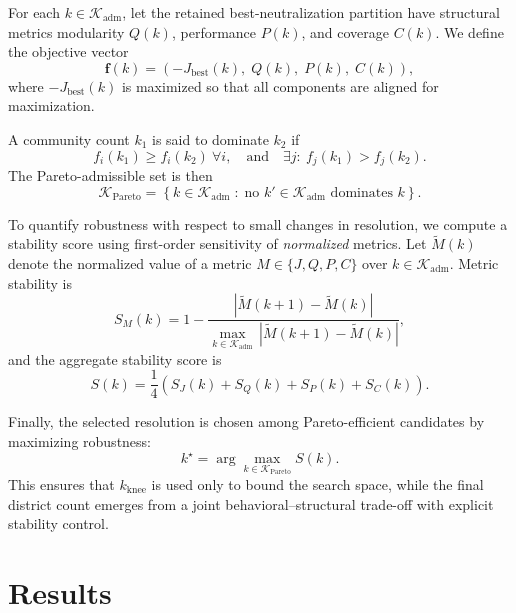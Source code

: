 \documentclass[conference]{IEEEtran}
\begin{document}
For each $k \in \mathcal{K}_{\mathrm{adm}}$, let the retained best-neutralization
partition have structural metrics modularity $Q(k)$, performance $P(k)$, and
coverage $C(k)$. We define the objective vector
\begin{equation}
\mathbf{f}(k)=\left(-J_{\mathrm{best}}(k),\;Q(k),\;P(k),\;C(k)\right),
\end{equation}
where $-J_{\mathrm{best}}(k)$ is maximized so that all components are aligned
for maximization.

A community count $k_1$ is said to dominate $k_2$ if
\begin{equation}
f_i(k_1)\ge f_i(k_2)\ \forall i,
\quad\text{and}\quad
\exists j:\ f_j(k_1)>f_j(k_2).
\end{equation}
The Pareto-admissible set is then
\begin{equation}
\mathcal{K}_{\mathrm{Pareto}}
=
\left\{
k \in \mathcal{K}_{\mathrm{adm}} \;:\;
\text{no } k' \in \mathcal{K}_{\mathrm{adm}} \text{ dominates } k
\right\}.
\end{equation}

To quantify robustness with respect to small changes in resolution, we compute
a stability score using first-order sensitivity of \emph{normalized} metrics.
Let $\tilde{M}(k)$ denote the normalized value of a metric
$M \in \{J,Q,P,C\}$ over $k \in \mathcal{K}_{\mathrm{adm}}$. Metric stability is
\begin{equation}
S_M(k)=
1-
\frac{|\tilde{M}(k+1)-\tilde{M}(k)|}
{\max_{k\in\mathcal{K}_{\mathrm{adm}}}\,|\tilde{M}(k+1)-\tilde{M}(k)|},
\end{equation}
and the aggregate stability score is
\begin{equation}
S(k)=\frac{1}{4}\left(S_J(k)+S_Q(k)+S_P(k)+S_C(k)\right).
\end{equation}

Finally, the selected resolution is chosen among Pareto-efficient candidates by
maximizing robustness:
\begin{equation}
k^\star=\arg\max_{k \in \mathcal{K}_{\mathrm{Pareto}}} S(k).
\end{equation}
This ensures that $k_{\mathrm{knee}}$ is used only to bound the search space,
while the final district count emerges from a joint behavioral--structural
trade-off with explicit stability control.%
\section{Results}
\end{document}
